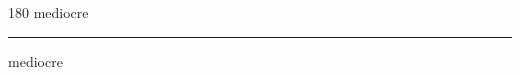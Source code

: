 
\begin{frame}
\begin{center}
\begin{turn}{180}
{\fontsize{2.5cm}{1em}\selectfont mediocre}
\end{turn}
\vspace{1em}\par  
\hrule
\vspace{1em}\par  
{\fontsize{2.5cm}{1em}\selectfont mediocre}
\end{center}
\end{frame}
